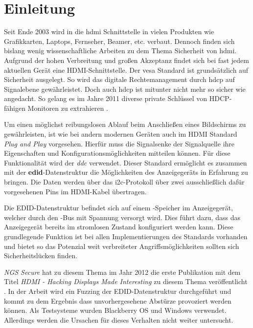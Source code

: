

\section{Einleitung}
\label{sec:introduction}
Seit Ende 2003 wird in die \gls{hdmi} Schnittstelle in vielen Produkten wie Grafikkarten, Laptops, Fernseher, Beamer, etc. verbaut. Dennoch finden sich bislang wenig wissenschaftliche Arbeiten zu dem Thema Sicherheit von \acrshort{hdmi}. Aufgrund der hohen Verbreitung und großen Akzeptanz findet sich bei fast jedem aktuellen Gerät eine HDMI-Schnittstelle. Der \acrshort{vesa} Standard ist grundsätzlich auf Sicherheit ausgelegt. So wird das digitale Rechtemanagement durch \gls{hdcp} auf Signalebene gewährleistet. Doch auch \acrshort{hdcp} ist mitunter nicht mehr so sicher wie angedacht. So gelang es im Jahre 2011 diverse private Schlüssel von HDCP-fähigen Monitoren zu extrahieren \cite{5766480}.

Um  einen möglichst reibungslosen Ablauf beim Anschließen eines Bildschirms zu gewährleisten, ist wie bei andern modernen Geräten auch im HDMI Standard \emph{Plug and Play} vorgesehen. Hierfür muss die Signalsenke der Signalquelle ihre Eigenschaften und Konfigurationsmöglichkeiten mitteilen können. 
Für diese Funktionalität wird der \emph{\gls{ddc}} verwendet. Dieser Standard ermöglicht es zusammen mit der \textbf{\gls{edid}}-Datenstruktur die Möglichkeiten des Anzeigegeräts in Erfahrung zu bringen. Die Daten werden über das \acrshort{i2c}-Protokoll über zwei ausschließlich dafür vorgesehenen Pins im HDMI-Kabel übertragen. 

Die EDID-Datenstruktur befindet sich auf einem \eeprom-Speicher im Anzeigegerät, welcher durch den \interintegratedbus-Bus mit Spannung versorgt wird. Dies führt dazu, dass das Anzeigegerät bereits im stromlosen Zustand konfiguriert werden kann. 
Diese grundlegende Funktion ist bei allen Implementierungen des Standards vorhanden und bietet so das Potenzial weit verbreiteter Angriffsmöglichkeiten sollten sich Sicherheitslücken finden.

\emph{NGS Secure} hat zu diesem Thema im Jahr 2012 die erste Publikation mit dem Titel \emph{HDMI - Hacking Displays Made Interesting} zu diesem Thema veröffentlicht \cite{AndyDavis}. In der Arbeit wird ein Fuzzing der EDID-Datenstruktur durchgeführt und kommt zu dem Ergebnis dass unvorhergesehene Abstürze  provoziert werden können. Als Testsysteme wurden Blackberry OS und Windows verwendet. Allerdings werden die Ursachen für dieses Verhalten nicht weiter untersucht. \\

